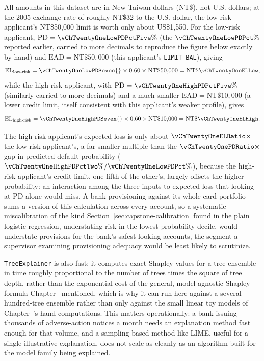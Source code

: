 \documentclass[../ai_in_finance]{subfiles}
\begin{document}
All amounts in this dataset are in New Taiwan dollars (NT\$), not U.S. dollars; at the 2005 exchange rate of roughly NT\$32 to the U.S. dollar, the low-risk applicant's NT\$50{,}000 limit is worth only about US\$1{,}550. For the low-risk applicant, $\text{PD}=\vChTwentyOneLowPDPctFive\%$ (the $\vChTwentyOneLowPDPct\%$ reported earlier, carried to more decimals to reproduce the figure below exactly by hand) and $\text{EAD}=\text{NT}\$50{,}000$ (this applicant's \texttt{LIMIT\_BAL}), giving
\begin{equation*}
\text{EL}_{\text{low-risk}} = \vChTwentyOneLowPDSeven{} \times 0.60 \times \text{NT}\$50{,}000 = \text{NT}\$\vChTwentyOneELLow,
\end{equation*}
while the high-risk applicant, with $\text{PD}=\vChTwentyOneHighPDPctFive\%$ (similarly carried to more decimals) and a much smaller $\text{EAD}=\text{NT}\$10{,}000$ (a lower credit limit, itself consistent with this applicant's weaker profile), gives
\begin{equation*}
\text{EL}_{\text{high-risk}} = \vChTwentyOneHighPDSeven{} \times 0.60 \times \text{NT}\$10{,}000 = \text{NT}\$\vChTwentyOneELHigh.
\end{equation*}

The high-risk applicant's expected loss is only about $\vChTwentyOneELRatio\times$ the low-risk applicant's, a far smaller multiple than the $\vChTwentyOnePDRatio\times$ gap in predicted default probability ($\vChTwentyOneHighPDPctTwo\%/\vChTwentyOneLowPDPct\%$), because the high-risk applicant's credit limit, one-fifth of the other's, largely offsets the higher probability: an interaction among the three inputs to expected loss that looking at PD alone would miss. A bank provisioning against its whole card portfolio sums a version of this calculation across every account, so a systematic miscalibration of the kind Section~\ref{sec:capstone-calibration} found in the plain logistic regression, understating risk in the lowest-probability decile, would understate provisions for the bank's safest-looking accounts, the segment a supervisor examining provisioning adequacy would be least likely to scrutinize.

\texttt{TreeExplainer} is also fast: it computes exact Shapley values for a tree ensemble in time roughly proportional to the number of trees times the square of tree depth, rather than the exponential cost of the general, model-agnostic Shapley formula Chapter~ mentioned, which is why it can run here against a several-hundred-tree ensemble rather than only against the small linear toy models of Chapter~'s hand computations. This matters operationally: a bank issuing thousands of adverse-action notices a month needs an explanation method fast enough for that volume, and a sampling-based method like LIME, useful for a single illustrative explanation, does not scale as cleanly as an algorithm built for the model family being explained.
\end{document}
